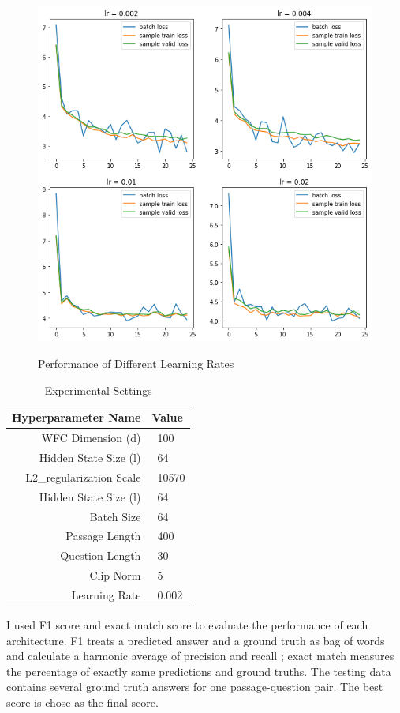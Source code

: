 \documentclass[modernstyle,12pt]{sjsuthesis}
\theoremstyle{definition}
\begin{document}
\begin{figure}[htbp]\centering
  \includegraphics[width=12cm, height=12cm]{figures/lr.png}
  \caption{Performance of Different Learning Rates}
  \label{f:lr}
\end{figure}

\begin{table}[htbp]\centering
  \caption{Experimental Settings}
  \label{tab:settings}
  \begin{tabular}{|r|l|} \hline
    Hyperparameter Name& Value \\ \hline\hline
    WFC Dimension (d) & \ 100 \\
    Hidden State Size (l) & \ 64 \\
    L2\_regularization Scale & \ 10570\\
    Hidden State Size (l) & \ 64\\
    Batch Size & \ 64\\
    Passage Length & \ 400\\
    Question Length & \ 30\\
    Clip Norm & \ 5\\
    Learning Rate & \ 0.002 \\ \hline
  \end{tabular}
\end{table}

I used F1 score and exact match score to evaluate the performance of each architecture. F1 treats a predicted answer and a ground truth as bag of words and calculate a harmonic average of precision and recall ; exact match measures the percentage of exactly same predictions and ground truths. The testing data contains several ground truth answers for one passage-question pair. The best score is chose as the final score.
\end{document}
